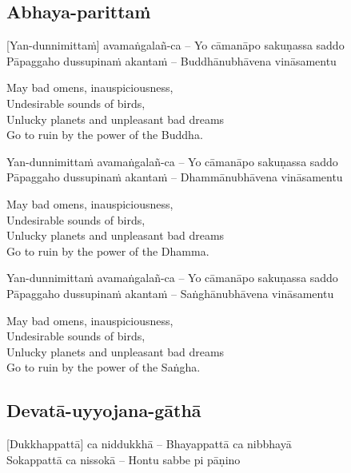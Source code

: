 \suttaRef{[Thai]}

\subsection{Abhaya-parittaṁ}
\label{abhaya-parittam}
[Yan-dunnimittaṁ] avamaṅgalañ-ca – Yo cāmanāpo sakuṇassa saddo\\
Pāpaggaho dussupinaṁ akantaṁ – Buddhānubhāvena vināsamentu

\begin{english}
  May bad omens, inauspiciousness,\\
  Undesirable sounds of birds,\\
  Unlucky planets and unpleasant bad dreams\\
  Go to ruin by the power of the Buddha.
\end{english}

Yan-dunnimittaṁ avamaṅgalañ-ca – Yo cāmanāpo sakuṇassa saddo\\
Pāpaggaho dussupinaṁ akantaṁ – Dhammānubhāvena vināsamentu

\begin{english}
  May bad omens, inauspiciousness,\\
  Undesirable sounds of birds,\\
  Unlucky planets and unpleasant bad dreams\\
  Go to ruin by the power of the Dhamma.
\end{english}

Yan-dunnimittaṁ avamaṅgalañ-ca – Yo cāmanāpo sakuṇassa saddo\\
Pāpaggaho dussupinaṁ akantaṁ – Saṅghānubhāvena vināsamentu

\begin{english}
  May bad omens, inauspiciousness,\\
  Undesirable sounds of birds,\\
  Unlucky planets and unpleasant bad dreams\\
  Go to ruin by the power of the Saṅgha.
\end{english}

\suttaRef{[Trad]}

\subsection{Devatā-uyyojana-gāthā}
\label{devata-uyyojana-gatha}
[Dukkhappattā] ca niddukkhā – Bhayappattā ca nibbhayā\\
Sokappattā ca nissokā – Hontu sabbe pi pāṇino

